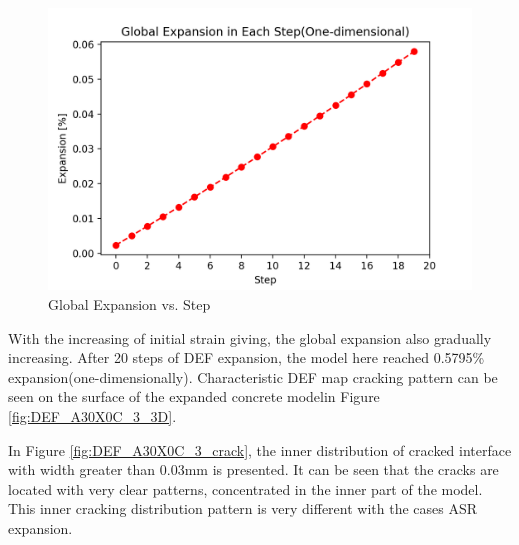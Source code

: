   \begin{figure}[ht!]
  \centering
  \includegraphics[width=.8\linewidth]{Files/exp_plot/DEFA30X0C_3_exp.png}
    \caption{Global Expansion vs. Step}
    \label{fig:DEFA30X0C_3_exp}
  \end{figure}

With the increasing of initial strain giving, the global expansion also gradually increasing. After 20 steps of DEF expansion, the model here reached 0.5795\% expansion(one-dimensionally). Characteristic DEF map cracking pattern can be seen on the surface of the expanded concrete modelin Figure \ref{fig:DEF_A30X0C_3_3D}.

In Figure \ref{fig:DEF_A30X0C_3_crack}, the inner distribution of cracked interface with width greater than 0.03mm is presented. It can be seen that the cracks are located with very clear patterns, concentrated in the inner part of the model. This inner cracking distribution pattern is very different with the cases ASR expansion.

